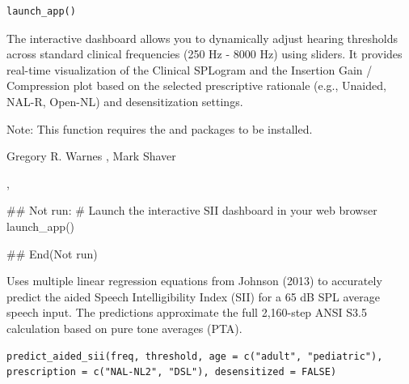 \documentclass[letterpaper]{book}
\begin{document}
%
\begin{Usage}
\begin{verbatim}
launch_app()
\end{verbatim}
\end{Usage}
%
\begin{Details}
The interactive dashboard allows you to dynamically adjust hearing thresholds across standard clinical frequencies (250 Hz - 8000 Hz) using sliders. It provides real-time visualization of the Clinical SPLogram and the Insertion Gain / Compression plot based on the selected prescriptive rationale (e.g., Unaided, NAL-R, Open-NL) and desensitization settings.

Note: This function requires the  and  packages to be installed.
\end{Details}
%
\begin{Author}
Gregory R. Warnes , Mark Shaver 
\end{Author}
%
\begin{SeeAlso}
, 
\end{SeeAlso}
%
\begin{Examples}
\begin{ExampleCode}
## Not run: 
  # Launch the interactive SII dashboard in your web browser
  launch_app()

## End(Not run)
\end{ExampleCode}
\end{Examples}
%
\begin{Description}
Uses multiple linear regression equations from Johnson (2013) to accurately predict 
the aided Speech Intelligibility Index (SII) for a 65 dB SPL average speech input. 
The predictions approximate the full 2,160-step ANSI S3.5 calculation based on pure 
tone averages (PTA).
\end{Description}
%
\begin{Usage}
\begin{verbatim}
predict_aided_sii(freq, threshold, age = c("adult", "pediatric"), prescription = c("NAL-NL2", "DSL"), desensitized = FALSE)
\end{verbatim}
\end{Usage}
%
\end{document}
